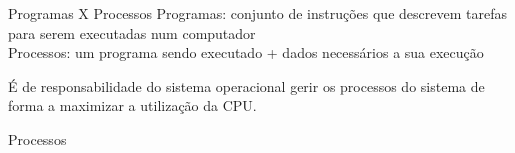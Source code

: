 \documentclass[11pt]{beamer}
\begin{document}

\begin{frame}{Programas X Processos}
Programas: conjunto de instruções que descrevem tarefas para serem executadas num computador\\
\vspace{0.4in}
Processos: um programa sendo executado + dados necessários a sua execução

É de responsabilidade do sistema operacional gerir os processos do sistema de forma a maximizar a 
utilização da CPU.
\end{frame}



\begin{frame}{Processos}
\begin{figure}[h]

{}
\end{figure}

\end{frame}
\end{document}
